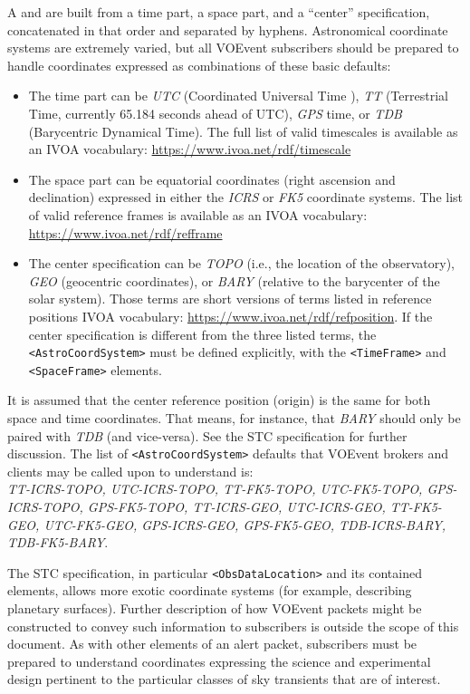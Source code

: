 \documentclass[11pt,a4paper]{ivoa}
\begin{document}
A  and  are built from a time part, a space part,
and a ``center'' specification, concatenated in that order and separated by
hyphens. Astronomical coordinate systems are extremely varied, but all VOEvent
subscribers should be prepared to handle coordinates expressed as combinations
of these basic defaults:
\begin{itemize}
\item The time part can be \emph{UTC} (Coordinated Universal Time
\citep{bib26}), \emph{TT} (Terrestrial Time, currently 65.184 seconds ahead of
UTC), \emph{GPS} time, or \emph{TDB} (Barycentric Dynamical Time). The full list
of valid timescales is available as an IVOA vocabulary:
\url{https://www.ivoa.net/rdf/timescale}
\item The space part can be equatorial coordinates (right ascension and
declination) expressed in either the \emph{ICRS} or \emph{FK5} coordinate
systems. The list of valid reference frames is available as an IVOA vocabulary:
\url{https://www.ivoa.net/rdf/refframe}
\item The center specification can be \emph{TOPO} (i.e., the location of the
observatory), \emph{GEO} (geocentric coordinates), or \emph{BARY} (relative to
the barycenter of the solar system). Those terms are short versions of terms
listed in reference positions IVOA vocabulary: \url{https://www.ivoa.net/rdf/refposition}.
If the center specification is different from the three listed terms, the
\verb|<AstroCoordSystem>| must be defined explicitly, with the \verb|<TimeFrame>|
and \verb|<SpaceFrame>| elements.
\end{itemize}


It is assumed that the center reference position (origin) is the same for both
space and time coordinates. That means, for instance, that \emph{BARY} should
only be paired with \emph{TDB} (and vice-versa). See the STC specification
\citep{2007ivoa.spec.1030R} %
for further discussion. The list of \verb|<AstroCoordSystem>| defaults that
VOEvent brokers and clients may be called upon to understand is: \\
\emph{TT-ICRS-TOPO, UTC-ICRS-TOPO, TT-FK5-TOPO, UTC-FK5-TOPO, GPS-ICRS-TOPO,
GPS-FK5-TOPO, TT-ICRS-GEO, UTC-ICRS-GEO, TT-FK5-GEO, UTC-FK5-GEO, GPS-ICRS-GEO,
GPS-FK5-GEO, TDB-ICRS-BARY, TDB-FK5-BARY}.

The STC specification, in particular \verb|<ObsDataLocation>| and its contained
elements, allows more exotic coordinate systems (for example, describing
planetary surfaces). Further description of how VOEvent packets might be
constructed to convey such information to subscribers is outside the scope of
this document. As with other elements of an alert packet, subscribers must be
prepared to understand coordinates expressing the science and experimental
design pertinent to the particular classes of sky transients that are of
interest.
\end{document}
